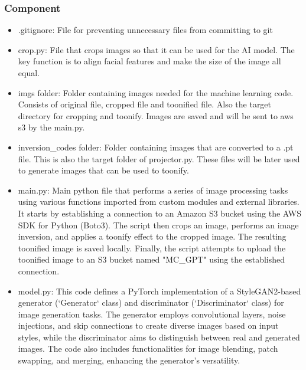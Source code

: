 \documentclass[conference]{IEEEtran}
\begin{document}
        \subsubsection{Component}
            \begin{itemize}
                \item .gitignore: File for preventing unnecessary files from committing to git\\
                \vspace{3mm}
                \item crop.py: File that crops images so that it can be used for the AI model. The key function is to align facial features and make the size of the image all equal.\\
                \vspace{3mm}
                \item imgs folder: Folder containing images needed for the machine learning code. Consists of original file, cropped file and toonified file. Also the target directory for cropping and toonify. Images are saved and will be sent to aws s3 by the main.py.\\
                \vspace{3mm}
                \item inversion\_codes folder: Folder containing images that are converted to a .pt file. This is also the target folder of projector.py. These files will be later used to generate images that can be used to toonify.\\
                \vspace{3mm}
                \item main.py: Main python file that performs a series of image processing tasks using various functions imported from custom modules and external libraries. It starts by establishing a connection to an Amazon S3 bucket using the AWS SDK for Python (Boto3). The script then crops an image, performs an image inversion, and applies a toonify effect to the cropped image. The resulting toonified image is saved locally. Finally, the script attempts to upload the toonified image to an S3 bucket named "MC\_GPT" using the established connection.\\
                \vspace{3mm}
                \item model.py: This code defines a PyTorch implementation of a StyleGAN2-based generator (`Generator` class) and discriminator (`Discriminator` class) for image generation tasks. The generator employs convolutional layers, noise injections, and skip connections to create diverse images based on input styles, while the discriminator aims to distinguish between real and generated images. The code also includes functionalities for image blending, patch swapping, and merging, enhancing the generator's versatility.\\

\end{itemize}
\end{document}

